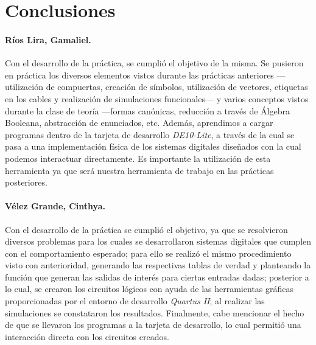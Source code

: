 \documentclass[../main.tex]{subfiles}
\begin{document}
\clearpage
\section{Conclusiones}
\paragraph{Ríos Lira, Gamaliel.} Con el desarrollo de la práctica, se cumplió 
el objetivo de la misma. Se pusieron en práctica los diversos elementos vistos 
durante las prácticas anteriores ---utilización de compuertas, creación de 
símbolos, utilización de vectores, etiquetas en los cables y realización de 
simulaciones funcionales--- y varios conceptos vistos durante la clase de 
teoría ---formas canónicas, reducción a través de Álgebra Booleana, 
abstracción de enunciados, etc. Además, aprendimos a cargar programas dentro 
de la tarjeta de desarrollo \textit{DE10-Lite}, a través de la cual se pasa a 
una implementación física de los sistemas digitales diseñados con la cual 
podemos interactuar directamente. Es importante la utilización de esta 
herramienta ya que será nuestra herramienta de trabajo en las prácticas 
posteriores.

\paragraph{Vélez Grande, Cinthya.} Con el desarrollo de la práctica se cumplió 
el objetivo, ya que se resolvieron diversos problemas para los cuales se 
desarrollaron  sistemas digitales que cumplen con el comportamiento esperado; 
para ello se realizó el mismo procedimiento visto con anterioridad, generando 
las respectivas tablas de verdad y planteando la función que generan las 
salidas de interés para ciertas entradas dadas; posterior a lo cual, se 
crearon los circuitos lógicos con ayuda de las herramientas gráficas 
proporcionadas por el entorno de desarrollo \textit{Quartus II}; al realizar 
las simulaciones se constataron los resultados.  Finalmente, cabe mencionar el 
hecho de que se llevaron los programas a la tarjeta de desarrollo, lo cual 
permitió una interacción directa con los circuitos creados.
\end{document}
